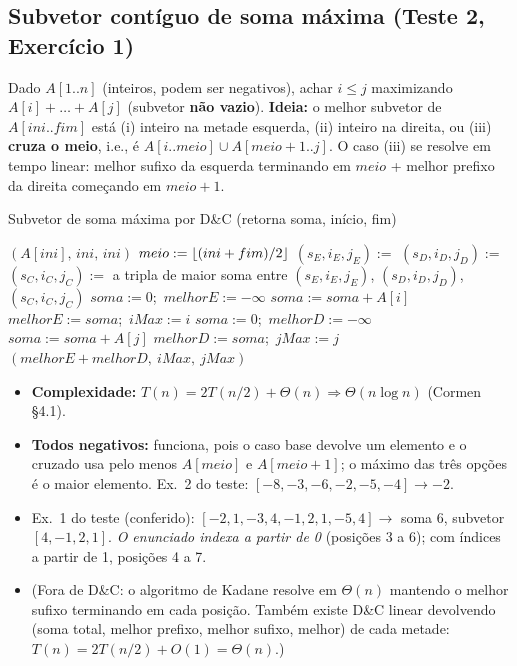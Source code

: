 \subsection{Subvetor contíguo de soma máxima (Teste 2, Exercício 1)}
Dado $A[1..n]$ (inteiros, podem ser negativos), achar $i\le j$ maximizando $A[i]+\dots+A[j]$ (subvetor \textbf{não vazio}).
\textbf{Ideia:} o melhor subvetor de $A[ini..fim]$ está (i) inteiro na metade esquerda, (ii) inteiro na direita, ou (iii) \textbf{cruza o meio}, i.e., é $A[i..meio]\cup A[meio+1..j]$. O caso (iii) se resolve em tempo linear: melhor sufixo da esquerda terminando em $meio$ + melhor prefixo da direita começando em $meio+1$.
\begin{pseudo}{Subvetor de soma máxima por D\&C (retorna soma, início, fim)}
\begin{algorithmic}
   \State \Return $(A[ini],\,ini,\,ini)$ 
  \EndIf
  \State $meio:=\lfloor(ini+fim)/2\rfloor$
  \State $(s_E,i_E,j_E):=$ 
  \State $(s_D,i_D,j_D):=$ 
  \State $(s_C,i_C,j_C):=$ 
  \State \Return a tripla de maior soma entre $(s_E,i_E,j_E)$, $(s_D,i_D,j_D)$, $(s_C,i_C,j_C)$
\EndFunction
{}
  \State $soma:=0$;\ $melhorE:=-\infty$
    \State $soma:=soma+A[i]$
     \State $melhorE:=soma$;\ $iMax:=i$ \EndIf
  \EndFor
  \State $soma:=0$;\ $melhorD:=-\infty$
    \State $soma:=soma+A[j]$
     \State $melhorD:=soma$;\ $jMax:=j$ \EndIf
  \EndFor
  \State \Return $(melhorE+melhorD,\ iMax,\ jMax)$
\EndFunction
\end{algorithmic}
\end{pseudo}
\begin{itemize}
  \item \textbf{Complexidade:} $T(n)=2T(n/2)+\Theta(n)\Rightarrow\Theta(n\log n)$ (Cormen §4.1).
  \item \textbf{Todos negativos:} funciona, pois o caso base devolve um elemento e o cruzado usa pelo menos $A[meio]$ e $A[meio+1]$; o máximo das três opções é o maior elemento. Ex.\ 2 do teste: $[-8,-3,-6,-2,-5,-4]\to -2$.
  \item Ex.\ 1 do teste (conferido): $[-2,1,-3,4,-1,2,1,-5,4]\to$ soma $6$, subvetor $[4,-1,2,1]$. \emph{O enunciado indexa a partir de 0} (posições 3 a 6); com índices a partir de 1, posições 4 a 7.
  \item (Fora de D\&C: o algoritmo de Kadane resolve em $\Theta(n)$ mantendo o melhor sufixo terminando em cada posição. Também existe D\&C linear devolvendo (soma total, melhor prefixo, melhor sufixo, melhor) de cada metade: $T(n)=2T(n/2)+O(1)=\Theta(n)$.)
\end{itemize}

